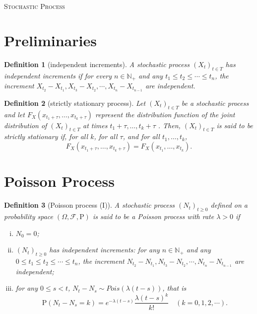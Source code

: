 \documentclass{article}
\newtheorem{definition}{Definition}[section]
\theoremstyle{nonumberplain}
\begin{document}
	\begin{center}
	\textsc{\Huge Stochastic Process}	
\end{center}
\vspace{1em} 

\section{Preliminaries}
\begin{definition}[independent increments]
  A stochastic process $(X_t)_{t\in T}$ has \emph{independent increments} if for every $n\in \mathbb{N}_+$ and any $t_1\le t_2 \le\cdots\le t_n$, the increment $X_{t_2}-X_{t_1},X_{t_3}-X_{t_2},\cdots,X_{t_n}-X_{t_{n-1}}$ are independent.
\end{definition}


\begin{definition}[strictly stationary process]
	Let $(X_t)_{t\in T}$ be a stochastic process and let  $F_{{X}}(x_{{t_{1}+\tau }},\ldots ,x_{{t_{k}+\tau }})$ represent the  distribution function of the joint distribution of $(X_t)_{t\in T}$ at times $t_{1}+\tau ,\ldots ,t_{k}+\tau$ . Then, $(X_t)_{t\in T}$ is said to be strictly stationary if, for all $k$, for all $\tau$, and for all $ t_{1},\ldots ,t_{k}$,
	\[
	F_{{X}}(x_{{t_{1}+\tau }},\ldots ,x_{{t_{k}+\tau }})=F_{{X}}(x_{{t_{1}}},\ldots ,x_{{t_{k}}}).
	\]
\end{definition}






\section{Poisson Process}
\begin{definition}[Poisson process (I)]
	A stochastic process $(N_t)_{t\ge0}$ defined on a probability space $(\Omega,\mathcal{F},\mathrm{P})$ is said to be a \emph{Poisson process} with rate $\lambda>0$ if
	\begin{enumerate}[(i)]
		\item $N_0=0$;
		\item \hypertarget{Definition 2.1(ii)}{} $(N_t)_{t\ge0}$ has independent increments: for any $n\in \mathbb{N}_+$ and any $0\le t_1\le t_2 \le\cdots\le t_n$, the increment $N_{t_2}-N_{t_1},N_{t_3}-N_{t_2},\cdots,N_{t_n}-N_{t_{n-1}}$ are independent;
		\item for any $0\le s < t$, $N_t-N_s\sim Pois(\lambda(t-s))$, that is 
		\[
		\mathrm{P}(N_t-N_s=k)=e^{-\lambda(t-s)}\dfrac{\lambda(t-s)^k}{k!}\quad(k=0,1,2,\cdots).
		\]
	\end{enumerate}	
\end{definition}
\end{document}
